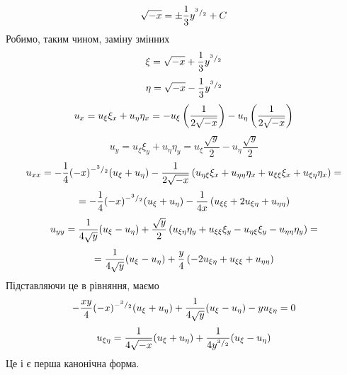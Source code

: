 \documentclass[12pt]{article} %
\begin{document}
\[\sqrt{-x}=\pm\frac{1}{3}y^{{^{3}/_{2}}}+C\]
Робимо, таким чином, заміну змінних
\[\xi=\sqrt{-x}+\frac{1}{3}y^{{^{3}/_{2}}}\]
\[\eta=\sqrt{-x}-\frac{1}{3}y^{{^{3}/_{2}}}\]
\[u_x=u_\xi\xi_x+u_\eta\eta_x=-u_\xi\left(\frac{1}{2\sqrt{-x}}\right)-u_\eta\left(\frac{1}{2\sqrt{-x}}\right)\]
\[u_y=u_\xi\xi_y+u_\eta\eta_y=u_\xi\frac{\sqrt{y}}{2}-u_\eta\frac{\sqrt{y}}{2}\]
\[u_{xx}=-\frac{1}{4}(-x)^{-{^{3}/_{2}}}(u_\xi+u_\eta)-\frac{1}{2\sqrt{-x}}\left(u_{\eta\xi}\xi_x+u_{\eta\eta}\eta_x+
u_{\xi\xi}\xi_x+u_{\xi\eta}\eta_x\right)=\]\[=-\frac{1}{4}(-x)^{-{^{3}/_{2}}}(u_\xi+u_\eta)-\frac{1}{4x}\left(u_{\xi\xi}+2u_{\xi\eta}+
u_{\eta\eta}\right)\]
\[u_{yy}=\frac{1}{4\sqrt{y}}(u_\xi-u_\eta)+\frac{\sqrt{y}}{2}\left(u_{\xi\eta}\eta_y+u_{\xi\xi}\xi_y-u_{\eta\xi}\xi_y-u_{\eta\eta}
\eta_y\right)=\]\[=\frac{1}{4\sqrt{y}}(u_\xi-u_\eta)+\frac{y}{4}\left({-2u_{\xi\eta}}+u_{\xi\xi}+u_{\eta\eta}\right)\]
Підставляючи це в рівняння, маємо
\[-\frac{xy}{4}(-x)^{-{^{3}/_{2}}}(u_\xi+u_\eta)+\frac{1}{4\sqrt{y}}(u_\xi-u_\eta)-yu_{\xi\eta}=0\]
\[u_{\xi\eta}=\frac{1}{4\sqrt{-x}}(u_\xi+u_\eta)+\frac{1}{4{y}^{{^{3}/_{2}}}}(u_\xi-u_\eta)\]
Це і є перша канонічна форма.
\end{document}
